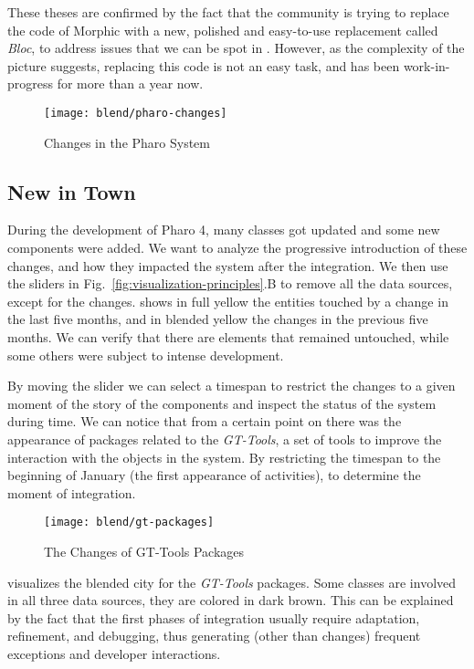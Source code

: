 These theses are confirmed by the fact that the community is trying to replace the code of Morphic with a new, polished and easy-to-use replacement called \textit{Bloc}, to address issues that we can be spot in . However, as the complexity of the picture suggests, replacing this code is not an easy task, and has been work-in-progress for more than a year now.



\begin{figure*}[ht]
\centering
\texttt{[image: blend/pharo-changes]}
\caption{Changes in the Pharo System}
\label{fig:pharo-changes}
\end{figure*}

\subsection{New in Town}

During the development of Pharo 4, many classes got updated and some new components were added. We want to analyze the progressive introduction of these changes, and how they impacted the system after the integration. We then use the sliders in Fig.~\ref{fig:visualization-principles}.B to remove all the data sources, except for the changes.  shows in full yellow the entities touched by a change in the last five months, and in blended yellow the changes in the previous five months. We can verify that there are elements that remained untouched, while some others were subject to intense development. 

By moving the slider we can select a timespan to restrict the changes to a given moment of the story of the components and inspect the status of the system during time. We can notice that from a certain point on there was the appearance of packages related to the \emph{GT-Tools}, a set of tools to improve the interaction with the objects in the system. By restricting the timespan to the beginning of January (\ie the first appearance of activities), to determine the moment of integration.

\begin{figure}[h]
\centering
\texttt{[image: blend/gt-packages]}
\caption{The Changes of GT-Tools Packages}
\label{fig:gt-spotter-packages}
\end{figure}

 visualizes the blended city for the \emph{GT-Tools} packages. Some classes are involved in all three data sources, \ie they are colored in dark brown. This can be explained by the fact that the first phases of integration usually require adaptation, refinement, and debugging, thus generating (other than changes) frequent exceptions and developer interactions.

